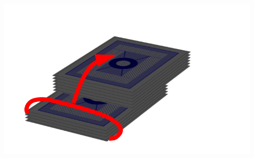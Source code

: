 \begin{frame}
{\begin{center}
\includegraphics[scale=0.5]{image/hummer3.png}\\
{\em \underline{}}
\end{center}
}%
\end{frame}

